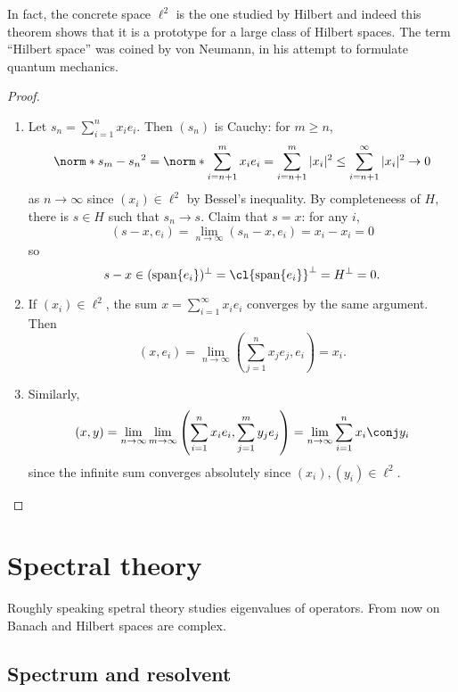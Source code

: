 \documentclass[a4paper]{article}
\DeclareMathOperator{\spans}{span} %
\begin{document}

In fact, the concrete space \(\ell^2\) is the one studied by Hilbert and indeed this theorem shows that it is a prototype for a large class of Hilbert spaces. The term ``Hilbert space'' was coined by von Neumann, in his attempt to formulate quantum mechanics.

\begin{proof}\leavevmode
  \begin{enumerate}
  \item Let \(s_n = \sum_{i = 1}^n x_ie_i\). Then \((s_n)\) is Cauchy: for \(m \geq n\),
    \[
      \norm*{s_m - s_n}^2
      = \norm*{\sum_{i = n + 1}^m x_ie_i}
      = \sum_{i = n + 1}^m |x_i|^2
      \leq \sum_{i = n + 1}^\infty |x_i|^2
      \to 0
    \]
    as \(n \to \infty\) since \((x_i) \in \ell^2\) by Bessel's inequality. By completeneess of \(H\), there is \(s \in H\) such that \(s_n \to s\). Claim that \(s = x\): for any \(i\),
    \[
      (s - x, e_i)
      = \lim_{n \to \infty} (s_n - x, e_i)
      = x_i - x_i
      = 0
    \]
    so
    \[
      s - x \in (\spans \{e_i\})^\perp
      = \cl{\spans \{e_i\}}^\perp
      = H^\perp
      = 0.
    \]
  \item If \((x_i) \in \ell^2\), the sum \(x = \sum_{i = 1}^\infty x_ie_i\) converges by the same argument. Then
    \[
      (x, e_i) = \lim_{n \to \infty} \left( \sum_{j = 1}^n x_je_j, e_i \right) = x_i.
    \]
  \item Similarly,
    \[
      (x, y) = \lim_{n \to \infty} \lim_{m \to \infty} \left( \sum_{i = 1}^n x_ie_i, \sum_{j = 1}^m y_j e_j \right) = \lim_{n \to \infty} \sum_{i = 1}^n x_i \conj y_i
    \]
    since the infinite sum converges absolutely since \((x_i), (y_i) \in \ell^2\).
  \end{enumerate}
\end{proof}

\section{Spectral theory}

Roughly speaking spetral theory studies eigenvalues of operators. From now on Banach and Hilbert spaces are complex.

\subsection{Spectrum and resolvent}
\end{document}

